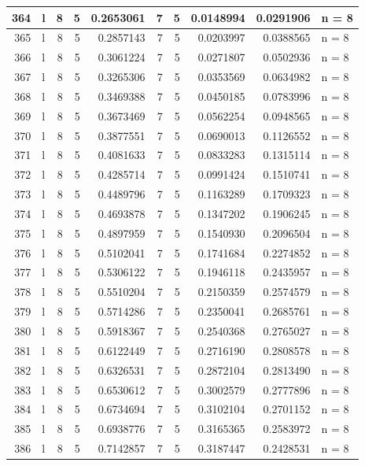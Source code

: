 \documentclass[
  letterpaper,
  DIV=11,
  numbers=noendperiod]{scrreprt}
\begin{document}
\begin{table}
\begin{tabular}[t]{r|l|r|r|r|r|r|r|r|l}
\hline
364 & l & 8 & 5 & 0.2653061 & 7 & 5 & 0.0148994 & 0.0291906 & n = 8\\
\hline
365 & l & 8 & 5 & 0.2857143 & 7 & 5 & 0.0203997 & 0.0388565 & n = 8\\
\hline
366 & l & 8 & 5 & 0.3061224 & 7 & 5 & 0.0271807 & 0.0502936 & n = 8\\
\hline
367 & l & 8 & 5 & 0.3265306 & 7 & 5 & 0.0353569 & 0.0634982 & n = 8\\
\hline
368 & l & 8 & 5 & 0.3469388 & 7 & 5 & 0.0450185 & 0.0783996 & n = 8\\
\hline
369 & l & 8 & 5 & 0.3673469 & 7 & 5 & 0.0562254 & 0.0948565 & n = 8\\
\hline
370 & l & 8 & 5 & 0.3877551 & 7 & 5 & 0.0690013 & 0.1126552 & n = 8\\
\hline
371 & l & 8 & 5 & 0.4081633 & 7 & 5 & 0.0833283 & 0.1315114 & n = 8\\
\hline
372 & l & 8 & 5 & 0.4285714 & 7 & 5 & 0.0991424 & 0.1510741 & n = 8\\
\hline
373 & l & 8 & 5 & 0.4489796 & 7 & 5 & 0.1163289 & 0.1709323 & n = 8\\
\hline
374 & l & 8 & 5 & 0.4693878 & 7 & 5 & 0.1347202 & 0.1906245 & n = 8\\
\hline
375 & l & 8 & 5 & 0.4897959 & 7 & 5 & 0.1540930 & 0.2096504 & n = 8\\
\hline
376 & l & 8 & 5 & 0.5102041 & 7 & 5 & 0.1741684 & 0.2274852 & n = 8\\
\hline
377 & l & 8 & 5 & 0.5306122 & 7 & 5 & 0.1946118 & 0.2435957 & n = 8\\
\hline
378 & l & 8 & 5 & 0.5510204 & 7 & 5 & 0.2150359 & 0.2574579 & n = 8\\
\hline
379 & l & 8 & 5 & 0.5714286 & 7 & 5 & 0.2350041 & 0.2685761 & n = 8\\
\hline
380 & l & 8 & 5 & 0.5918367 & 7 & 5 & 0.2540368 & 0.2765027 & n = 8\\
\hline
381 & l & 8 & 5 & 0.6122449 & 7 & 5 & 0.2716190 & 0.2808578 & n = 8\\
\hline
382 & l & 8 & 5 & 0.6326531 & 7 & 5 & 0.2872104 & 0.2813490 & n = 8\\
\hline
383 & l & 8 & 5 & 0.6530612 & 7 & 5 & 0.3002579 & 0.2777896 & n = 8\\
\hline
384 & l & 8 & 5 & 0.6734694 & 7 & 5 & 0.3102104 & 0.2701152 & n = 8\\
\hline
385 & l & 8 & 5 & 0.6938776 & 7 & 5 & 0.3165365 & 0.2583972 & n = 8\\
\hline
386 & l & 8 & 5 & 0.7142857 & 7 & 5 & 0.3187447 & 0.2428531 & n = 8\\

\end{tabular}
\end{table}
\end{document}

